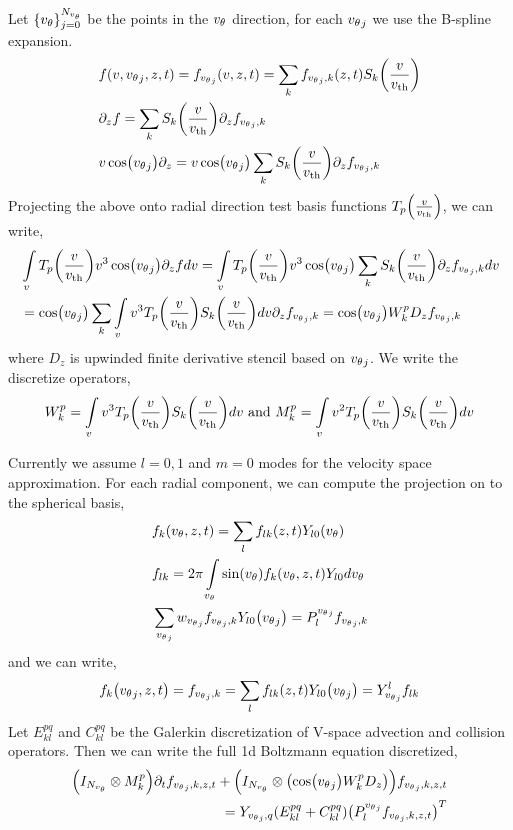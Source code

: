 \documentclass{article}[draft]
\begin{document}
Let $\{{v_{\theta}}\}_{j=0}^{N_{v_{\theta}}}$ be the points in the ${v_{\theta}}$ direction, for each ${v_{\theta}}_j$ we use the B-spline expansion. 
\begin{align*}
	&f(v, \vtheta_j , z, t) = f_{\vtheta_j} (v, z, t) = \sum_k f_{\vtheta_j, k} \of{z,t} S_k\of{\frac{v}{\vth}} \\
	& \partial_z f = \sum_{k} S_k\of{\frac{v}{\vth}} \partial_z f_{\vtheta_j, k} \\
	& v\cos\of{\vtheta_j} \partial_z  = v\cos\of{\vtheta_j} \sum_{k} S_k\of{\frac{v}{\vth}} \partial_z f_{\vtheta_j, k}
\end{align*} Projecting the above onto radial direction test basis functions $T_p\of{\frac{v}{\vth}}$, we can write, 
\begin{align*}
&\myint_v T_p \of{\frac{v}{\vth}} v^3 \cos\of{\vtheta_j} \partial_z f dv = \myint_v T_p \of{\frac{v}{\vth}} v^3\cos\of{\vtheta_j} \sum_{k} S_k\of{\frac{v}{\vth}} \partial_z f_{\vtheta_j, k} dv \\
&=\cos\of{\vtheta_j} \sum_k \myint_v v^3 T_p\of{\frac{v}{\vth}} S_k\of{\frac{v}{\vth}} dv \partial_z f_{\vtheta_j,k} = \cos\of{\vtheta_j} W^{p}_{k} D_z f_{\vtheta_j,k}
\end{align*} where $D_z$ is upwinded finite derivative stencil based on ${v_{\theta}}_j$. We write the discretize operators, 
\begin{align*}
W^{p}_{k} = \myint_v v^3 T_p\of{\frac{v}{\vth}} S_k\of{\frac{v}{\vth}} dv \text{ and }
M^{p}_{k} = \myint_v v^2 T_p\of{\frac{v}{\vth}} S_k\of{\frac{v}{\vth}} dv
\end{align*} 

Currently we assume $l=0, 1$ and $m=0$ modes for the velocity space approximation. For each radial component, we can compute the projection on to the spherical basis, 
\begin{align*}
&	f_k\of{\vtheta,z,t} = \sum_l f_{lk}\of{z, t} Y_{l0}\of{\vtheta}\\
&	f_{lk} = 2\pi \myint_{\vtheta} \sin\of{\vtheta} f_k\of{\vtheta, z, t} Y_{l0} d\vtheta \\
&\sum_{\vtheta_j} w_{\vtheta_j} f_{\vtheta_j,k} Y_{l0}\of{\vtheta_j} = P^{\vtheta_j}_l f_{\vtheta_j,k}
\end{align*} and we can write, 
\begin{align*}
	f_k\of{\vtheta_j, z, t} = f_{\vtheta_j,k} = \sum_l f_{lk}\of{z,t} Y_{l0}\of{\vtheta_j} = Y^{l}_{\vtheta_j} f_{lk}
\end{align*}
Let $E^{pq}_{kl}$ and $C^{pq}_{kl}$ be the Galerkin discretization of V-space advection and collision operators. Then we can write the full 1d Boltzmann equation discretized, 
\begin{align*}
\of{I_{N_\vtheta} \otimes M^{p}_{k}} \partial_t f_{\vtheta_j, k , z, t} + \of{I_{N_\vtheta} \otimes \of{\cos\of{\vtheta_j} W^{p}_k D_z}} f_{\vtheta_j, k , z, t} \\
= Y_{\vtheta_j, q} (E^{pq}_{kl} + C^{pq}_{kl}) \of{P^{\vtheta_j}_{l} f_{\vtheta_j,k,z,t}}^{T}
\end{align*}
\end{document}
